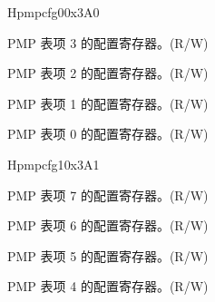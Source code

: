 \begin{register}{H}{pmpcfg0}{0x3A0}
\label{regdesc:pmpcfg0}%
%
%
%
%
\regnewline%
\begin{regdesc}
\begin{reglist}
\label{fielddesc:pmp3cfg}\item [pmp3cfg] PMP 表项 3 的配置寄存器。(R/W)\\
\label{fielddesc:pmp2cfg}\item [pmp2cfg] PMP 表项 2 的配置寄存器。(R/W)\\
\label{fielddesc:pmp1cfg}\item [pmp1cfg] PMP 表项 1 的配置寄存器。(R/W)\\
\label{fielddesc:pmp0cfg}\item [pmp0cfg] PMP 表项 0 的配置寄存器。(R/W)\\
\end{reglist}
\end{regdesc}
\end{register}

\begin{register}{H}{pmpcfg1}{0x3A1}
\label{regdesc:pmpcfg1}%
%
%
%
%
\regnewline%
\begin{regdesc}
\begin{reglist}
\label{fielddesc:pmp7cfg}\item [pmp7cfg] PMP 表项 7 的配置寄存器。(R/W)\\
\label{fielddesc:pmp6cfg}\item [pmp6cfg] PMP 表项 6 的配置寄存器。(R/W)\\
\label{fielddesc:pmp5cfg}\item [pmp5cfg] PMP 表项 5 的配置寄存器。(R/W)\\
\label{fielddesc:pmp4cfg}\item [pmp4cfg] PMP 表项 4 的配置寄存器。(R/W)\\
\end{reglist}
\end{regdesc}
\end{register}


